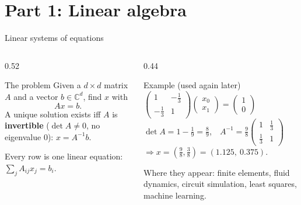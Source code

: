 \documentclass[aspectratio=169,11pt]{beamer}
\newcommand{\key}[1]{{\color{qdark}\textbf{#1}}}
\begin{document}
\section{Part 1: Linear algebra}
\begin{frame}{Linear systems of equations}
  \begin{columns}[T]
    \begin{column}{0.52\textwidth}
      \begin{block}{The problem}
        Given a $d\times d$ matrix $A$ and a vector $b\in\mathbb C^d$, find $x$ with
        \[ Ax = b. \]
        A unique solution exists iff $A$ is \key{invertible} ($\det A \ne 0$, no eigenvalue $0$): $x = A^{-1}b$.
      \end{block}
      \small Every row is one linear equation: $\sum_j A_{ij}x_j = b_i$.
    \end{column}
    \begin{column}{0.44\textwidth}
      \begin{exampleblock}{Example (used again later)}
        $\begin{pmatrix}1 & -\frac13\\ -\frac13 & 1\end{pmatrix}\begin{pmatrix}x_0\\x_1\end{pmatrix} = \begin{pmatrix}1\\0\end{pmatrix}$\\[1mm]
        $\det A = 1 - \frac19 = \frac89$,\ \ $A^{-1} = \frac98\begin{pmatrix}1 & \frac13\\ \frac13 & 1\end{pmatrix}$\\[1mm]
        $\Rightarrow x = \left(\frac98, \frac38\right) = (1.125,\ 0.375)$.
      \end{exampleblock}
      \small Where they appear: finite elements, fluid dynamics, circuit simulation, least squares, machine learning.
    \end{column}
  \end{columns}
\end{frame}
\end{document}
